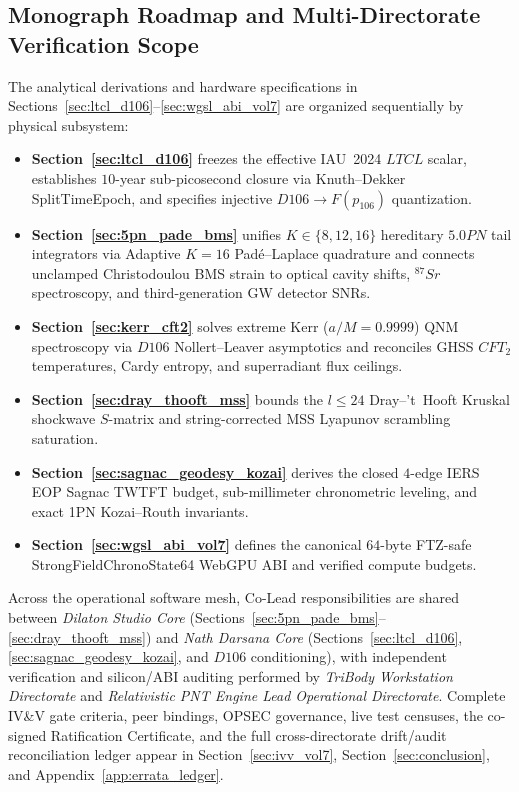 \documentclass[11pt,a4paper,reqno]{article}
\def\texttt#1{#1}%
\def\mathrm#1{#1}%
\def\mathbb#1{#1}%
\def\F#1{F(#1)}%
\def\Done{D106}%
\def\LTCL{LTCL}%
\theoremstyle{plain}
\theoremstyle{definition}
\theoremstyle{remark}
\numberwithin{equation}{section}
\numberwithin{table}{section}
\newcommand{\F}[1]{\mathbb{F}_{#1}}
\newcommand{\Done}{\mathbb{D}_{106}}
\newcommand{\LTCL}{L_{\mathrm{TCL}}}
\begin{document}
\subsection{Monograph Roadmap and Multi-Directorate Verification Scope}
The analytical derivations and hardware specifications in Sections~\ref{sec:ltcl_d106}--\ref{sec:wgsl_abi_vol7} are organized sequentially by physical subsystem:
\begin{itemize}[leftmargin=1.8em]
  \item \textbf{Section~\ref{sec:ltcl_d106}} freezes the effective IAU~2024 $\LTCL$ scalar, establishes $10$-year sub-picosecond closure via Knuth--Dekker \texttt{SplitTimeEpoch}, and specifies injective $\Done \to \F{p_{106}}$ quantization.
  \item \textbf{Section~\ref{sec:5pn_pade_bms}} unifies $K \in \{8, 12, 16\}$ hereditary $5.0\mathrm{PN}$ tail integrators via Adaptive $K=16$ Pad\'e--Laplace quadrature and connects unclamped Christodoulou BMS strain to optical cavity shifts, $^{87}\mathrm{Sr}$ spectroscopy, and third-generation GW detector SNRs.
  \item \textbf{Section~\ref{sec:kerr_cft2}} solves extreme Kerr ($a/M = 0.9999$) QNM spectroscopy via $\Done$ Nollert--Leaver asymptotics and reconciles GHSS $\mathrm{CFT}_2$ temperatures, Cardy entropy, and superradiant flux ceilings.
  \item \textbf{Section~\ref{sec:dray_thooft_mss}} bounds the $l \le 24$ Dray--'t~Hooft Kruskal shockwave $S$-matrix and string-corrected MSS Lyapunov scrambling saturation.
  \item \textbf{Section~\ref{sec:sagnac_geodesy_kozai}} derives the closed $4$-edge IERS EOP Sagnac TWTFT budget, sub-millimeter chronometric leveling, and exact 1PN Kozai--Routh invariants.
  \item \textbf{Section~\ref{sec:wgsl_abi_vol7}} defines the canonical $64$-byte FTZ-safe \texttt{StrongFieldChronoState64} WebGPU ABI and verified compute budgets.
\end{itemize}
Across the operational software mesh, Co-Lead responsibilities are shared between \emph{Dilaton Studio Core} (Sections~\ref{sec:5pn_pade_bms}--\ref{sec:dray_thooft_mss}) and \emph{Nath Darsana Core} (Sections~\ref{sec:ltcl_d106}, \ref{sec:sagnac_geodesy_kozai}, and $\Done$ conditioning), with independent verification and silicon/ABI auditing performed by \emph{TriBody Workstation Directorate} and \emph{Relativistic PNT Engine Lead Operational Directorate}. Complete IV\&V gate criteria, peer bindings, OPSEC governance, live test censuses, the co-signed Ratification Certificate, and the full cross-directorate drift/audit reconciliation ledger appear in Section~\ref{sec:ivv_vol7}, Section~\ref{sec:conclusion}, and Appendix~\ref{app:errata_ledger}.
\end{document}
